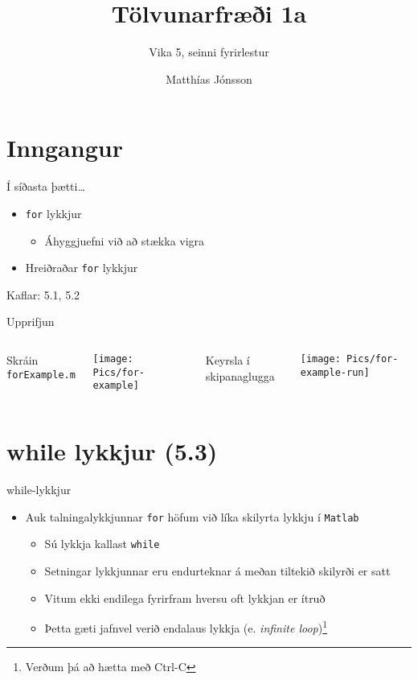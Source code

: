\documentclass{beamer}
\author{Matthías Jónsson}
\title{Tölvunarfræði 1a}
\subtitle{Vika 5, seinni fyrirlestur}
\begin{document}
\begin{frame}
\titlepage
\end{frame}

\section{Inngangur}

\begin{frame}{Í síðasta þætti\ldots}
\begin{itemize}
 \item \texttt{for} lykkjur
 \begin{itemize}
  \item Áhyggjuefni við að stækka vigra
 \end{itemize}
 \item Hreiðraðar \texttt{for} lykkjur
\end{itemize}
Kaflar: 5.1, 5.2
\end{frame}

\begin{frame}{Upprifjun}
\vspace{\baselineskip}
\begin{columns}
Skráin \texttt{forExample.m}
\begin{center}
\texttt{[image: Pics/for-example]}
\end{center}
Keyrsla í skipanaglugga
\begin{center}
\texttt{[image: Pics/for-example-run]}
\end{center}
\end{columns}
\end{frame}

\section{while lykkjur (5.3)}

\begin{frame}{while-lykkjur}
\begin{itemize}
 \item Auk talningalykkjunnar \texttt{for} höfum við líka skilyrta lykkju í \texttt{Matlab}
 \begin{itemize}
  \item Sú lykkja kallast \texttt{while}
  \item Setningar lykkjunnar eru endurteknar á meðan tiltekið skilyrði er satt
  \item Vitum ekki endilega fyrirfram hversu oft lykkjan er ítruð
  \item Þetta gæti jafnvel verið endalaus lykkja (e. \emph{infinite loop})\footnote{Verðum þá að hætta með Ctrl-C}
 \end{itemize}
\end{itemize}
\end{frame}
\end{document}
